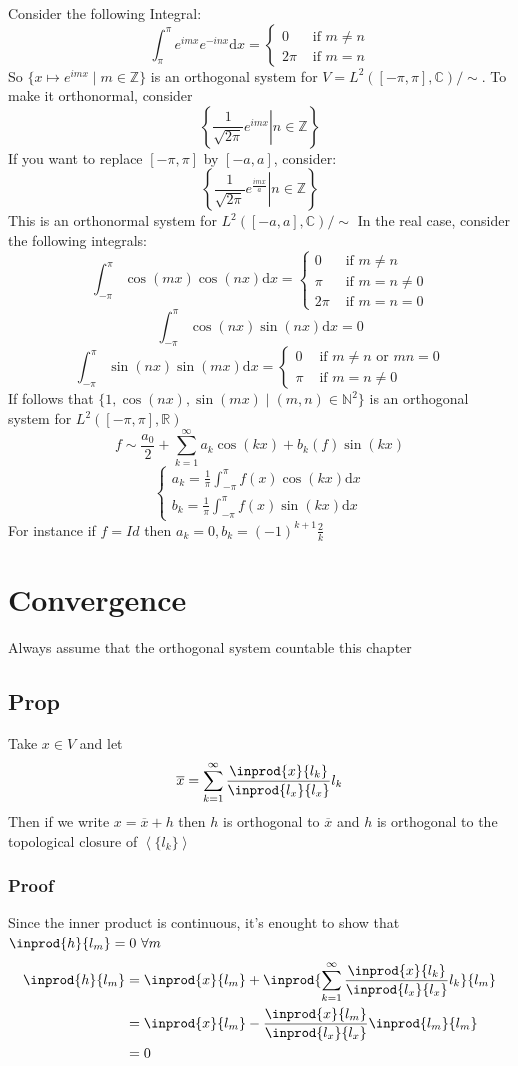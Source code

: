\documentclass{book}
\begin{document}
Consider the following Integral:
$$\int_{\pi}^\pi e^{imx}e^{-inx}\text{d}x=\begin{cases}
    0 & \text{ if }m\neq n\\2\pi&\text{ if }m=n
\end{cases}$$
So $\{x\mapsto e^{imx}\mid m\in \mathbb{Z}\}$ is an orthogonal system for $V=L^2([-\pi,\pi],\mathbb{C})/\sim$. To make it orthonormal, consider
$$\left\{\left.\frac{1}{\sqrt{2\pi}}e^{imx}\right| n\in \mathbb{Z}\right\}$$
If you want to replace $[-\pi,\pi]$ by $[-a,a]$, consider:
$$\left\{\left.\frac{1}{\sqrt{2\pi}}e^{\frac{imx}a}\right| n\in \mathbb{Z}\right\}$$
This is an orthonormal system for $L^2([-a,a],\mathbb{C})/\sim$ In the real case, consider the following integrals:
$$\int_{-\pi}^\pi\cos(mx)\cos(nx)\text{d}x=\begin{cases}
    0 & \text{ if }m\neq n\\\pi &\text{ if }m=n\neq0\\2\pi&\text{ if }m=n=0
\end{cases}$$
$$\int_{-\pi}^\pi\cos(nx)\sin(nx)\text{d}x=0$$
$$\int_{-\pi}^\pi\sin(nx)\sin(mx)\text{d}x=\begin{cases}
    0 & \text{ if }m\neq n\text{ or }mn=0\\\pi &\text{ if }m=n\neq0
\end{cases}$$
If follows that $\{1,\cos(nx),\sin(mx)\mid(m,n)\in \mathbb{N}^2\}$ is an orthogonal system for $L^2([-\pi,\pi],\mathbb{R})$
$$f\sim\frac{a_0}{2}+\sum\limits_{k=1}^\infty a_k\cos(kx)+b_k(f)\sin(kx)$$
$$\begin{cases}
    a_k=\frac{1}\pi\int_{-\pi}^\pi f(x)\cos(kx)\text{d}x\\
    b_k=\frac{1}\pi\int_{-\pi}^\pi f(x)\sin(kx)\text{d}x
\end{cases}$$
For instance if $f=Id$ then $a_k=0,b_k=(-1)^{k+1}\frac{2}{k}$
\chapter{Convergence}
Always assume that the orthogonal system countable this chapter
\section{Prop}Take $x\in V$ and let$$\overline x=\sum\limits_{k=1}^\infty\frac{\inprod{x}{l_k}}{\inprod{l_x}{l_x}}l_k$$
Then if we write $x=\overline x+h$ then $h$ is orthogonal to $\overline{x}$ and $h$ is orthogonal to the topological closure of $\left<\{l_k\}\right>$
\subsection*{Proof}Since the inner product is continuous, it's enought to show that $\inprod{h}{l_m}=0\ \forall m$
$$
\begin{aligned}
    \inprod{h}{l_m} &=\inprod{x}{l_m}+\inprod{\sum\limits_{k=1}^\infty \frac{\inprod{x}{l_k}}{\inprod{l_x}{l_x}}l_k}{l_m}\\
    &=\inprod{x}{l_m}-\frac{\inprod{x}{l_m}}{\inprod{l_x}{l_x}}\inprod{l_m}{l_m}\\ &=0
\end{aligned}
$$
\end{document}
